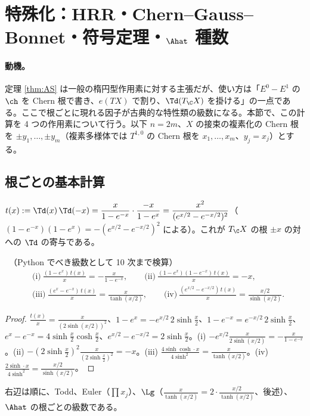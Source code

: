 
\section{特殊化：HRR・Chern--Gauss--Bonnet・符号定理・$\Ahat$ 種数}\label{sec:special}
\paragraph{動機。}定理 \ref{thm:AS} は一般の楕円型作用素に対する主張だが、使い方は「$E^0-E^1$ の $\ch$ を Chern 根で書き、$e(TX)$ で割り、$\Td(T_{\C}X)$ を掛ける」の一点である。ここで根ごとに現れる因子が古典的な特性類の級数になる。本節で、この計算を 4 つの作用素について行う。以下 $n=2m$、$X$ の接束の複素化の Chern 根を $\pm y_1,\dots,\pm y_m$（複素多様体では $T^{1,0}$ の Chern 根を $x_1,\dots,x_m$、$y_j=x_j$）とする。

\subsection{根ごとの基本計算}
$t(x):=\Td(x)\,\Td(-x)=\dfrac{x}{1-e^{-x}}\cdot\dfrac{-x}{1-e^{x}}=\dfrac{x^2}{(e^{x/2}-e^{-x/2})^2}$（$(1-e^{-x})(1-e^x)=-(e^{x/2}-e^{-x/2})^2$ による）。これが $T_{\C}X$ の根 $\pm x$ の対への $\Td$ の寄与である。
\begin{lem}[根ごとの計算]\label{lem:rootcalc}\tP\ （Python でべき級数として 10 次まで検算）
\begin{align*}
&\text{(i)}\ \frac{(1-e^{x})\,t(x)}{x}=-\frac{x}{1-e^{-x}},\qquad\text{(ii)}\ \frac{(1-e^{x})(1-e^{-x})\,t(x)}{x}=-x,\\
&\text{(iii)}\ \frac{(e^{x}-e^{-x})\,t(x)}{x}=\frac{x}{\tanh(x/2)},\qquad\text{(iv)}\ \frac{(e^{x/2}-e^{-x/2})\,t(x)}{x}=\frac{x/2}{\sinh(x/2)}.
\end{align*}
\end{lem}
\begin{proof}
$\frac{t(x)}x=\frac{x}{(2\sinh(x/2))^2}$、$1-e^{x}=-e^{x/2}\,2\sinh\frac x2$、$1-e^{-x}=e^{-x/2}\,2\sinh\frac x2$、$e^x-e^{-x}=4\sinh\frac x2\cosh\frac x2$、$e^{x/2}-e^{-x/2}=2\sinh\frac x2$。(i) $-e^{x/2}\frac x{2\sinh(x/2)}=-\frac x{1-e^{-x}}$。(ii) $-(2\sinh\frac x2)^2\frac x{(2\sinh\frac x2)^2}=-x$。(iii) $\frac{4\sinh\cosh\cdot x}{4\sinh^2}=\frac x{\tanh(x/2)}$。(iv) $\frac{2\sinh\cdot x}{4\sinh^2}=\frac{x/2}{\sinh(x/2)}$。
\end{proof}
右辺は順に、Todd、Euler（$\prod x_j$）、$\Lg$（$\frac x{\tanh(x/2)}=2\cdot\frac{x/2}{\tanh(x/2)}$、後述）、$\Ahat$ の根ごとの級数である。

